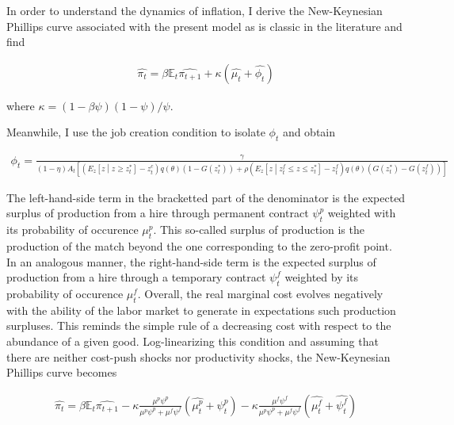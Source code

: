 \documentclass[a4paper]{article}
\begin{document}
In order to understand the dynamics of inflation, I derive the New-Keynesian Phillips curve associated with the present model as is classic in the literature and find

\begin{align*}
\widehat{\pi_t} = \beta \mathbb{E}_t \widehat{\pi_{t+1}} + \kappa \left( \widehat{\mu_t} + \widehat{\phi_t} \right)
\end{align*}

where $\kappa = (1-\beta \psi) (1-\psi) / \psi$.

Meanwhile, I use the job creation condition to isolate $\phi_t$ and obtain

\begin{align*}
\phi_t = \frac{\gamma}{ (1-\eta) A_t \left[ \left( E_z \left[ z \middle| z \geq z_t^* \right] - z_t^c \right) q\left( \theta \right) \left( 1 - G\left( z_t^* \right)\right) + \rho \left( E_z \left[ z \middle| z_t^f \leq z \leq z_t^* \right] - z_t^f \right) q\left( \theta \right) \left( G\left( z_t^* \right) - G\left( z_t^f \right)\right) \right] }
\end{align*}  

The left-hand-side term in the bracketted part of the denominator is the expected surplus of production from a hire through permanent contract $\psi_t^p$ weighted with its probability of occurence $\mu_t^p$. This so-called surplus of production is the production of the match beyond the one corresponding to the zero-profit point. In an analogous manner, the right-hand-side term is the expected surplus of production from a hire through a temporary contract $\psi_t^f$ weighted by its probability of occurence $\mu_t^f$. Overall, the real marginal cost evolves negatively with the ability of the labor market to generate in expectations such production surpluses. This reminds the simple rule of a decreasing cost with respect to the abundance of a given good. Log-linearizing this condition and assuming that there are neither cost-push shocks nor productivity shocks, the New-Keynesian Phillips curve becomes

\begin{align*}
\widehat{\pi_t} = \beta \mathbb{E}_t \widehat{\pi_{t+1}} - \kappa \frac{\mu^p \psi^p}{\mu^p \psi^p + \mu^f \psi^f} \left( \widehat{\mu_t^p} + \widehat{\psi_t^p} \right) - \kappa \frac{\mu^f \psi^f}{\mu^p \psi^p + \mu^f \psi^f} \left( \widehat{\mu_t^f} + \widehat{\psi_t^f} \right)
\end{align*}
\end{document}
